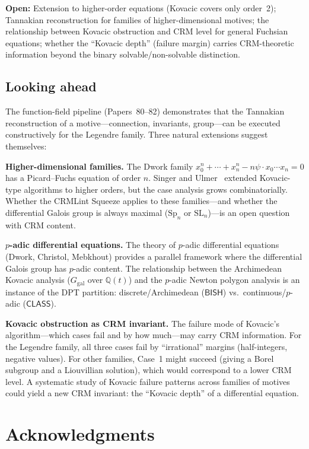 \documentclass[11pt]{article}
\theoremstyle{plain}
\theoremstyle{definition}
\theoremstyle{remark}
\newcommand{\Q}{\mathbb{Q}}
\newcommand{\SL}{\mathrm{SL}}
\newcommand{\Sp}{\mathrm{Sp}}
\newcommand{\Ggal}{G_{\mathrm{gal}}}
\newcommand{\BISH}{\mathsf{BISH}}
\newcommand{\CLASS}{\mathsf{CLASS}}
\begin{document}
\textbf{Open:} Extension to higher-order equations (Kovacic covers only order~2); Tannakian reconstruction for families of higher-dimensional motives; the relationship between Kovacic obstruction and CRM level for general Fuchsian equations; whether the ``Kovacic depth'' (failure margin) carries CRM-theoretic information beyond the binary solvable/non-solvable distinction.

\subsection{Looking ahead}

The function-field pipeline (Papers~80--82) demonstrates that the Tannakian reconstruction of a motive---connection, invariants, group---can be executed constructively for the Legendre family.
Three natural extensions suggest themselves:

\textbf{Higher-dimensional families.}
The Dwork family $x_0^n + \cdots + x_n^n - n\psi \cdot x_0 \cdots x_n = 0$ has a Picard--Fuchs equation of order $n$.
Singer and Ulmer~\cite{Singer2009} extended Kovacic-type algorithms to higher orders, but the case analysis grows combinatorially.
Whether the CRMLint Squeeze applies to these families---and whether the differential Galois group is always maximal ($\Sp_n$ or $\SL_n$)---is an open question with CRM content.

\textbf{$p$-adic differential equations.}
The theory of $p$-adic differential equations (Dwork, Christol, Mebkhout) provides a parallel framework where the differential Galois group has $p$-adic content.
The relationship between the Archimedean Kovacic analysis ($\Ggal$ over $\Q(t)$) and the $p$-adic Newton polygon analysis is an instance of the DPT partition: discrete/Archimedean ($\BISH$) vs.\ continuous/$p$-adic ($\CLASS$).

\textbf{Kovacic obstruction as CRM invariant.}
The failure mode of Kovacic's algorithm---which cases fail and by how much---may carry CRM information.
For the Legendre family, all three cases fail by ``irrational'' margins (half-integers, negative values).
For other families, Case~1 might succeed (giving a Borel subgroup and a Liouvillian solution), which would correspond to a lower CRM level.
A systematic study of Kovacic failure patterns across families of motives could yield a new CRM invariant: the ``Kovacic depth'' of a differential equation.

\section*{Acknowledgments}
\end{document}
